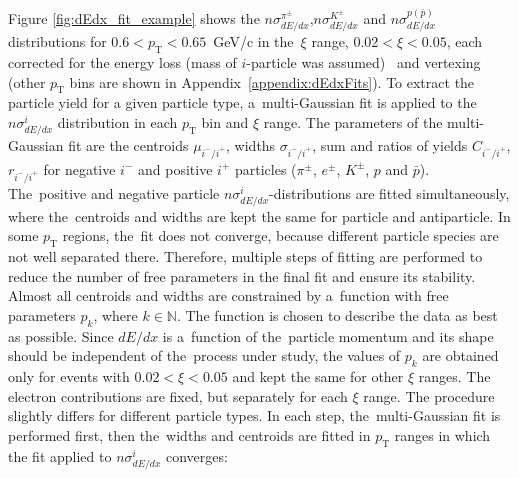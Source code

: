 \noindent Figure \ref{fig:dEdx_fit_example}
shows the $n\sigma^{\pi^\pm}_{dE/dx}$,$n\sigma^{K^\pm}_{dE/dx}$ and $n\sigma^{p(\bar{p})}_{dE/dx}$ distributions for  $0.6 < p_\textrm{T} < 0.65$~GeV/c  in the~$\xi$ range, $0.02 < \xi < 0.05$, each corrected for the energy loss (mass of $i$-particle was assumed)~\cite{supplementaryNote} and vertexing (other $p_\textrm{T}$ bins are shown in Appendix~\ref{appendix:dEdxFits}). To extract the  particle yield for a given particle type,
a~multi-Gaussian fit is applied to the $n\sigma^i_{dE/dx}$ distribution in each $p_\textrm{T}$ bin and $\xi$ range. The parameters of the multi-Gaussian fit are the centroids $\mu_{i^-/i^+}$, widths $\sigma_{i^-/i^+}$, sum  and ratios  of yields $C_{i^-/i^+}$, $r_{i^-/i^+}$ for negative $i^-$ and positive $i^+$ particles ($\pi^\pm$, $e^\pm$, $K^\pm$, $p$ and $\bar{p}$). The~positive and negative particle
$n\sigma^{i}_{dE/dx}$-distributions are fitted simultaneously, where the~centroids and widths are kept the same for particle
and antiparticle. 
In some $p_\textrm{T}$ regions, the~fit does not converge,
because different particle species are not well separated  there. Therefore, multiple steps of fitting are performed to reduce the number of free parameters in the final fit and ensure its stability. Almost all centroids and widths are constrained  by a~function with free parameters $p_k$, where $k \in \mathbb N$.  The function is chosen to describe the data as best as possible.
Since $dE/dx$ is a~function of the~particle momentum and its shape should be independent of the~process under study, the values of $p_k$  are obtained only for events with $0.02 < \xi < 0.05$ and kept the same for other $\xi$ ranges. The electron contributions are  fixed, but separately for each $\xi$ range. The procedure slightly differs for different particle types. In each step, the~multi-Gaussian fit is performed first, then the~widths and centroids are fitted in  $p_\textrm{T}$ ranges in which the fit applied to $n\sigma^{i}_{dE/dx}$ converges:
